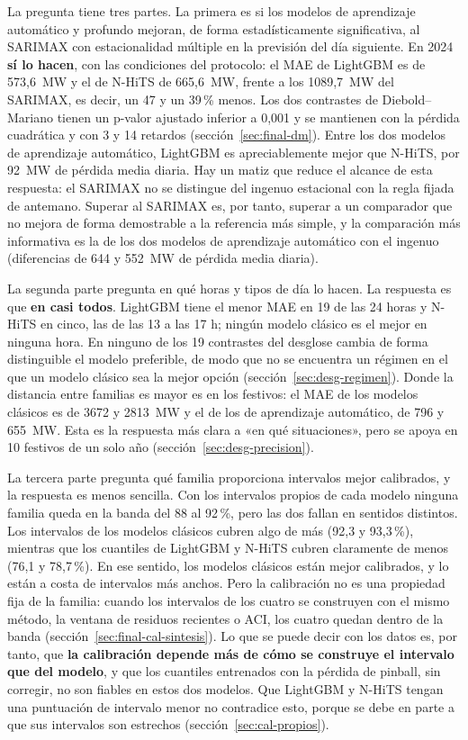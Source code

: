 La pregunta tiene tres partes. La primera es si los modelos de aprendizaje
automático y profundo mejoran, de forma estadísticamente significativa, al
SARIMAX con estacionalidad múltiple en la previsión del día siguiente. En 2024
\textbf{sí lo hacen}, con las condiciones del protocolo: el MAE de LightGBM es
de 573,6~MW y el de N-HiTS de 665,6~MW, frente a los 1089,7~MW del SARIMAX, es
decir, un 47 y un 39\,\% menos. Los dos contrastes de Diebold--Mariano tienen un
p-valor ajustado inferior a 0,001 y se mantienen con la pérdida cuadrática y con 3
y 14 retardos (sección~\ref{sec:final-dm}). Entre los dos modelos de aprendizaje
automático, LightGBM es apreciablemente mejor que N-HiTS, por 92~MW de pérdida
media diaria. Hay un matiz que reduce el alcance de esta respuesta: el SARIMAX
no se distingue del ingenuo estacional con la regla fijada de antemano. Superar
al SARIMAX es, por tanto, superar a un comparador que no mejora de forma
demostrable a la referencia más simple, y la comparación más informativa es la
de los dos modelos de aprendizaje automático con el ingenuo (diferencias de 644
y 552~MW de pérdida media diaria).

La segunda parte pregunta en qué horas y tipos de día lo hacen. La respuesta es
que \textbf{en casi todos}. LightGBM tiene el menor MAE en 19 de las 24 horas
y N-HiTS en cinco, las de las 13 a las 17 h; ningún modelo clásico es el
mejor en ninguna hora. En ninguno de los 19 contrastes del desglose cambia de
forma distinguible el modelo preferible, de modo que no se encuentra un régimen
en el que un modelo clásico sea la mejor opción
(sección~\ref{sec:desg-regimen}). Donde la distancia entre familias es mayor es
en los festivos: el MAE de los modelos clásicos es de 3672 y 2813~MW y el de los
de aprendizaje automático, de 796 y 655~MW. Esta es la respuesta más clara a «en
qué situaciones», pero se apoya en 10 festivos de un solo año
(sección~\ref{sec:desg-precision}).

La tercera parte pregunta qué familia proporciona intervalos mejor calibrados, y
la respuesta es menos sencilla. Con los intervalos propios de cada modelo
ninguna familia queda en la banda del 88 al 92\,\%, pero las dos fallan en
sentidos distintos. Los intervalos de los modelos clásicos cubren algo de más
(92,3 y 93,3\,\%), mientras que los cuantiles de LightGBM y N-HiTS cubren
claramente de menos (76,1 y 78,7\,\%). En ese sentido, los modelos clásicos
están mejor calibrados, y lo están a costa de intervalos más anchos. Pero la
calibración no es una propiedad fija de la familia: cuando los intervalos de los
cuatro se construyen con el mismo método, la ventana de residuos recientes o
ACI, los cuatro quedan dentro de la banda
(sección~\ref{sec:final-cal-sintesis}). Lo que se puede decir con los datos es,
por tanto, que \textbf{la calibración depende más de cómo se construye el
intervalo que del modelo}, y que los cuantiles entrenados con la pérdida de
pinball, sin corregir, no son fiables en estos dos modelos. Que LightGBM y
N-HiTS tengan una puntuación de intervalo menor no contradice esto, porque se
debe en parte a que sus intervalos son estrechos (sección~\ref{sec:cal-propios}).

